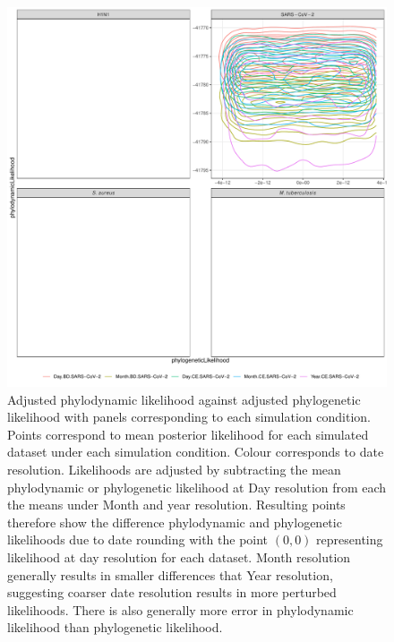 \documentclass{article}
\begin{document}
\begin{figure}
    \centering
    \includegraphics[width=\textwidth]{simulation_likelihood.pdf}
    \caption{Adjusted phylodynamic likelihood against adjusted phylogenetic likelihood with panels corresponding to each simulation condition. Points correspond to mean posterior likelihood for each simulated dataset under each simulation condition. Colour corresponds to date resolution. Likelihoods are adjusted by subtracting the mean phylodynamic or phylogenetic likelihood at Day resolution from each the means under Month and year resolution. Resulting points therefore show the difference phylodynamic and phylogenetic likelihoods due to date rounding with the point $(0, 0)$ representing likelihood at day resolution for each dataset. Month resolution generally results in smaller differences that Year resolution, suggesting coarser date resolution results in more perturbed likelihoods. There is also generally more error in phylodynamic likelihood than phylogenetic likelihood.}
    \label{fig:sim-likeihood}
\end{figure}
\end{document}
